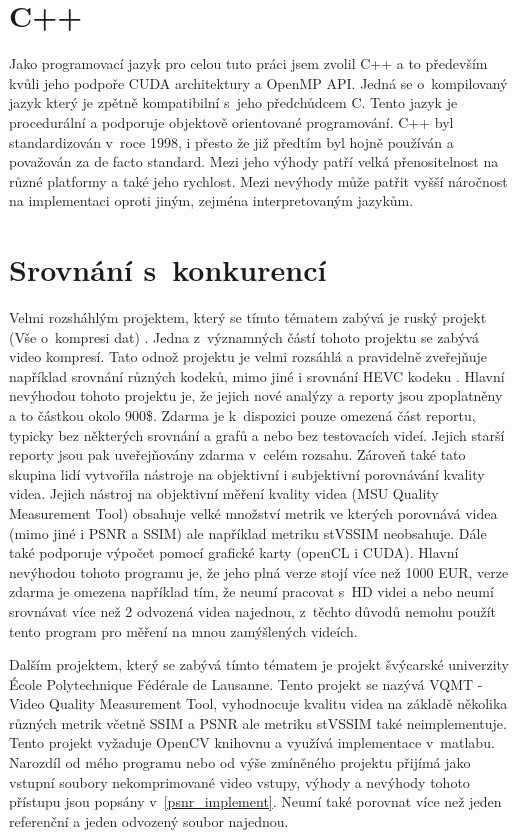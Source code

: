 \documentclass[thesis=M,czech]{FITthesis}[2016/06/26]
\begin{document}
\section{C++}
Jako programovací jazyk pro celou tuto práci jsem zvolil C++ a to především kvůli jeho podpoře CUDA architektury a OpenMP API. Jedná se o~kompilovaný jazyk který je zpětně kompatibilní s~jeho předchůdcem C. Tento jazyk je procedurální a podporuje objektově orientované programování. C++ byl standardizován v~roce 1998, i přesto že již předtím byl hojně používán a považován za de facto standard\cite{c++}. Mezi jeho výhody patří velká přenositelnost na různé platformy a také jeho rychlost. Mezi nevýhody může patřit vyšší náročnost na implementaci oproti jiným, zejména interpretovaným jazykům.    
\section{Srovnání s~konkurencí}
Velmi rozsháhlým projektem, který se tímto tématem zabývá je ruský projekt  (Vše o~kompresi dat) \cite{compression.ru}. Jedna z~významných částí tohoto projektu se zabývá video kompresí.  Tato odnož projektu je velmi rozsáhlá a pravidelně zveřejňuje například srovnání různých kodeků, mimo jiné i srovnání HEVC kodeku \cite{compression_HEVC}. Hlavní nevýhodou tohoto projektu je, že jejich nové analýzy a reporty jsou zpoplatněny a to částkou okolo 900\$. Zdarma je k~dispozici pouze omezená část reportu, typicky bez některých srovnání a grafů a nebo bez testovacích videí. Jejich starší reporty jsou pak uveřejňovány zdarma v~celém rozsahu. Zároveň také tato skupina lidí vytvořila nástroje na objektivní i subjektivní porovnávání kvality videa. Jejich nástroj na objektivní měření kvality videa (MSU Quality Measurement Tool) obsahuje velké množství metrik ve kterých porovnává videa (mimo jiné i PSNR a SSIM) ale například metriku stVSSIM neobsahuje. Dále také podporuje výpočet pomocí grafické karty (openCL i CUDA). Hlavní nevýhodou tohoto programu je, že jeho plná verze stojí více než 1000 EUR, verze zdarma je omezena například tím, že neumí pracovat s~HD videi a nebo neumí srovnávat více než 2 odvozená videa najednou, z~těchto důvodů nemohu použít tento program pro měření na mnou zamýšlených videích.

Dalším projektem, který se zabývá tímto tématem je projekt švýcarské univerzity École Polytechnique Fédérale de Lausanne. Tento projekt se nazývá VQMT - Video Quality Measurement Tool\cite{vqmt}, vyhodnocuje kvalitu videa na základě několika různých metrik včetně SSIM a PSNR ale metriku stVSSIM také neimplementuje. Tento projekt vyžaduje OpenCV knihovnu \cite{opencv} a využívá implementace v~matlabu. Narozdíl od mého programu nebo od výše zmíněného projektu přijímá jako vstupní soubory nekomprimované video vstupy, výhody a nevýhody tohoto přístupu jsou popsány v~\autoref{psnr_implement}. Neumí také porovnat více než jeden referenční a jeden odvozený soubor najednou.
\end{document}
